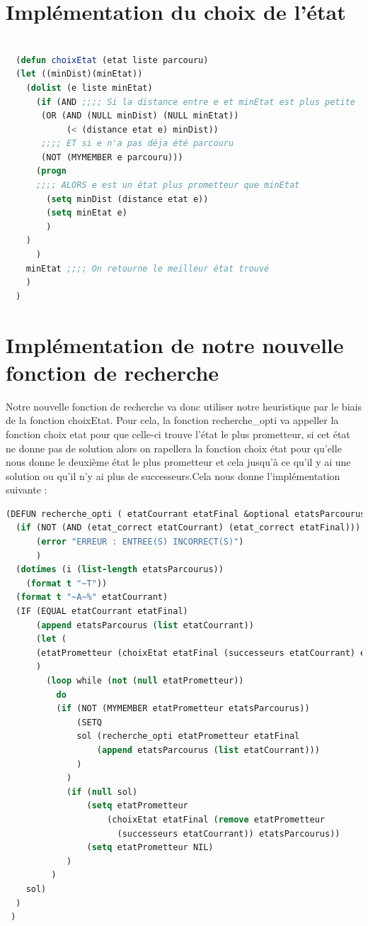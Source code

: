 \documentclass[a4paper,10pt]{report}
\begin{document}
  \section{Implémentation du choix de l'état}

    \begin{lstlisting}[language=Lisp]

  (defun choixEtat (etat liste parcouru)
  (let ((minDist)(minEtat))
    (dolist (e liste minEtat)
      (if (AND ;;;; Si la distance entre e et minEtat est plus petite
	   (OR (AND (NULL minDist) (NULL minEtat)) 
		    (< (distance etat e) minDist)) 
	   ;;;; ET si e n'a pas déja été parcouru
	   (NOT (MYMEMBER e parcouru)))        
	  (progn
	  ;;;; ALORS e est un état plus prometteur que minEtat
	    (setq minDist (distance etat e))   
	    (setq minEtat e)
	    )
	)
      )
    minEtat ;;;; On retourne le meilleur état trouvé
    )
  )
  \end{lstlisting}

\newpage
  
  \section{Implémentation de notre nouvelle fonction de recherche}
  
  Notre nouvelle fonction de recherche va donc utiliser notre heuristique par le biais de la fonction choixEtat. 
  Pour cela, la fonction recherche\_opti va appeller la fonction choix etat pour que celle-ci trouve l'état le plus prometteur, si cet 
  état ne donne pas de solution alors on rapellera la fonction choix état pour qu'elle nous donne le deuxième état le plus prometteur et 
  cela jusqu'à ce qu'il y ai une solution ou qu'il n'y ai plus de successeurs.\newline Cela nous donne l'implémentation suivante : 
  
  \begin{lstlisting}[basicstyle = \footnotesize, language=Lisp]
    (DEFUN recherche_opti ( etatCourrant etatFinal &optional etatsParcourus)
  (if (NOT (AND (etat_correct etatCourrant) (etat_correct etatFinal)))
      (error "ERREUR : ENTREE(S) INCORRECT(S)")
      )
  (dotimes (i (list-length etatsParcourus))
    (format t "~T"))                       
  (format t "~A~%" etatCourrant)            
  (IF (EQUAL etatCourrant etatFinal)
      (append etatsParcourus (list etatCourrant))
	  (let (
	  (etatPrometteur (choixEtat etatFinal (successeurs etatCourrant) etatsParcourus))
	  )
      	(loop while (not (null etatPrometteur))
	      do 
	      (if (NOT (MYMEMBER etatPrometteur etatsParcourus)) 
			  (SETQ 
			  sol (recherche_opti etatPrometteur etatFinal 
				  (append etatsParcourus (list etatCourrant)))
			  )
			)
			(if (null sol)
				(setq etatPrometteur 
				    (choixEtat etatFinal (remove etatPrometteur 
					  (successeurs etatCourrant)) etatsParcourus))
				(setq etatPrometteur NIL)
			)
		 )
    sol)
  )
 )
 
  \end{lstlisting}
\newpage 
\end{document}
